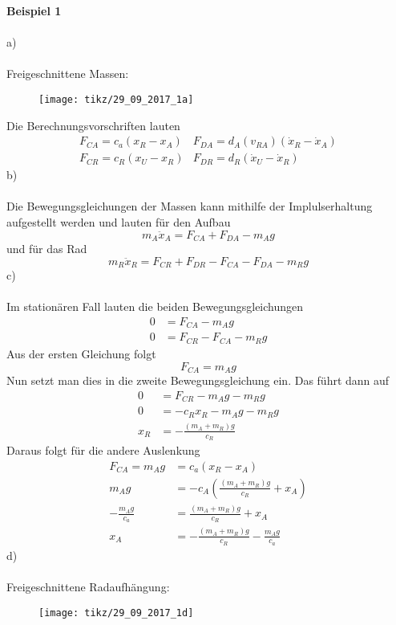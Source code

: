 \textbf{Beispiel 1}\\ \\
a)\\ \\
Freigeschnittene Massen:
\begin{figure}[h]
 	\centering
 	\texttt{[image: tikz/29\_09\_2017\_1a]}
\end{figure}
\newline
Die Berechnungsvorschriften lauten
\begin{align*}
	F_{CA} = c_a(x_R - x_A) & F_{DA} = d_A(v_{RA})(\dot{x}_R - \dot{x}_A) \\
	F_{CR} = c_R(x_U - x_R) & F_{DR} = d_R(\dot{x}_U - \dot{x}_R)
\end{align*}
b)\\ \\
Die Bewegungsgleichungen der Massen kann mithilfe der Implulserhaltung aufgestellt werden und lauten für den Aufbau
\[
	m_A\ddot{x}_A = F_{CA} + F_{DA} - m_Ag
\]
und für das Rad
\[
	m_R\ddot{x}_R = F_{CR} + F_{DR} - F_{CA} - F_{DA} - m_Rg
\]
c)\\ \\
Im stationären Fall lauten die beiden Bewegungsgleichungen
\begin{align*}
	0 &= F_{CA} - m_Ag \\
	0 &= F_{CR} - F_{CA} - m_Rg
\end{align*}
Aus der ersten Gleichung folgt
\[
	F_{CA} = m_Ag
\]
\newpage
\noindent
Nun setzt man dies in die zweite Bewegungsgleichung ein. Das führt dann auf
\begin{align*}
	0 &= F_{CR} - m_Ag - m_Rg \\
	0 &= -c_Rx_R - m_Ag - m_Rg \\
	x_R &= -\frac{(m_A + m_R)g}{c_R}
\end{align*}
Daraus folgt für die andere Auslenkung
\begin{align*}
	F_{CA} = m_Ag &= c_a(x_R - x_A) \\
	m_Ag &= -c_A\left(\frac{(m_A + m_R)g}{c_R} + x_A\right) \\
	-\frac{m_Ag}{c_a} &= \frac{(m_A + m_R)g}{c_R} + x_A \\
	x_A &= -\frac{(m_A + m_R)g}{c_R} - \frac{m_Ag}{c_a} 
\end{align*}
d)\\ \\
Freigeschnittene Radaufhängung:
\begin{figure}[h]
	\centering
	\texttt{[image: tikz/29\_09\_2017\_1d]}
\end{figure}
